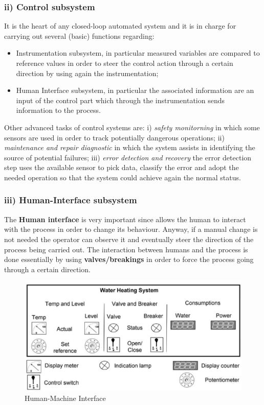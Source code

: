 \subsubsection{ii) Control subsystem}
It is the heart of any closed-loop automated system and it is in charge for carrying out several (basic) functions regarding: 
\begin{itemize}
    \itemsep-0.3em
    \item \textsf{Instrumentation subsystem}, in particular measured variables are compared to reference values in order to steer the control action through a certain direction by using again the instrumentation; 
    \item \textsf{Human Interface subsystem}, in particular the associated information are an input of the control part which through the instrumentation sends information to the process.
\end{itemize}
Other advanced tasks of control systems are: i) \textit{safety monitorning} in which some sensors are used in order to track potentially dangerous operations; ii) \textit{maintenance and repair diagnostic} in which the system assists in identifying the source of potential failures; iii) \textit{error detection and recovery} the error detection step uses the available sensor to pick data, classify the error and adopt the needed operation so that the system could achieve again the normal status.

\subsubsection{iii) Human-Interface subsystem}
The \textbf{Human interface} is very important since allows the human to interact with the process in order to change its behaviour. Anyway, if a manual change is not needed the operator can observe it and eventually steer the direction of the process being carried out. The interaction between humans and the process is done essentially by using \textbf{valves/breakings} in order to force the process going through a certain direction.

\begin{figure}
    \centering
    \includegraphics[scale=0.5]{img/hmi.png}
    \caption{Human-Machine Interface}
\end{figure}

